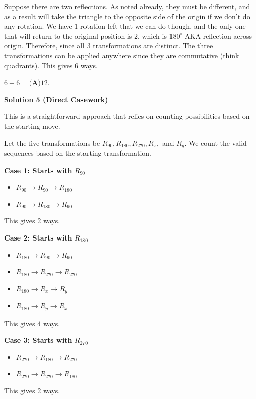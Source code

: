 \begin{enumerate}
 Suppose there are two reflections. As noted already, they must be different, and as a result will take the triangle to the opposite side of the origin if we don't do any rotation. We have $1$ rotation left that we can do though, and the only one that will return to the original position is $2$, which is $180^{\circ}$ AKA reflection across origin. Therefore, since all $3$ transformations are distinct. The three transformations can be applied anywhere since they are commutative (think quadrants). This gives $6$ ways.

 $6+6=\boxed{\textbf{(A)}  12}$.

 



\textbf{Solution 5 (Direct Casework)}

This is a straightforward approach that relies on counting possibilities based on the starting move.

 Let the five transformations be $R_{90}, R_{180}, R_{270}, R_x,$ and $R_y$. We count the valid sequences based on the starting transformation.

 \textbf{Case 1: Starts with $R_{90}$}

 
            \begin{itemize}
        \item $R_{90} \to R_{90} \to R_{180}$
        \item $R_{90} \to R_{180} \to R_{90}$
            \end{itemize}
            This gives 2 ways.

 \textbf{Case 2: Starts with $R_{180}$}

 
            \begin{itemize}
        \item $R_{180} \to R_{90} \to R_{90}$
        \item $R_{180} \to R_{270} \to R_{270}$
        \item $R_{180} \to R_x \to R_y$
        \item $R_{180} \to R_y \to R_x$
            \end{itemize}
            This gives 4 ways.

 \textbf{Case 3: Starts with $R_{270}$}

 
            \begin{itemize}
        \item $R_{270} \to R_{180} \to R_{270}$
        \item $R_{270} \to R_{270} \to R_{180}$
            \end{itemize}
            This gives 2 ways.


\end{enumerate}
